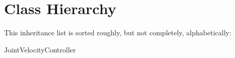 \section{Class Hierarchy}
This inheritance list is sorted roughly, but not completely, alphabetically\-:\begin{DoxyCompactList}
\item Joint\-Velocity\-Controller\begin{DoxyCompactList}
\item {}
\end{DoxyCompactList}
\item {}
\item {}
\end{DoxyCompactList}
